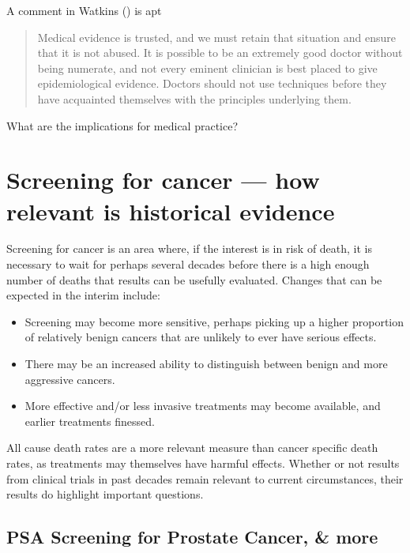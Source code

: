 \documentclass[
  10ptls,
  b5paper]{book}
\providecommand{\tightlist}{%
  \setlength{\itemsep}{0pt}\setlength{\parskip}{0pt}}
\begin{document}
A comment in Watkins () is apt

\begin{quote}
Medical evidence is trusted, and we must retain that situation and ensure that it is not abused. It is possible to be an extremely good doctor without being numerate, and not every eminent clinician is best placed to give epidemiological evidence. Doctors should not use techniques before they have acquainted themselves with the principles underlying them.
\end{quote}

What are the implications for medical practice?

\section{Screening for cancer --- how relevant is historical evidence}\label{screening-for-cancer-how-relevant-is-historical-evidence}

Screening for cancer is an area where, if the interest is in risk of death, it is necessary to wait for perhaps several decades before there is a high enough number of deaths that results can be usefully evaluated. Changes that can be expected in the interim include:

\begin{itemize}
\tightlist
\item
  Screening may become more sensitive, perhaps picking up a higher proportion of relatively benign cancers that are unlikely to ever have serious effects.\\
\item
  There may be an increased ability to distinguish between benign and more aggressive cancers.\\
\item
  More effective and/or less invasive treatments may become available, and earlier treatments finessed.
\end{itemize}

All cause death rates are a more relevant measure than cancer specific death rates, as treatments may themselves have harmful effects. Whether or not results from clinical trials in past decades remain relevant to current circumstances, their results do highlight important questions.

\subsection*{PSA Screening for Prostate Cancer, \& more}\label{psa-screening-for-prostate-cancer-more}
\end{document}
